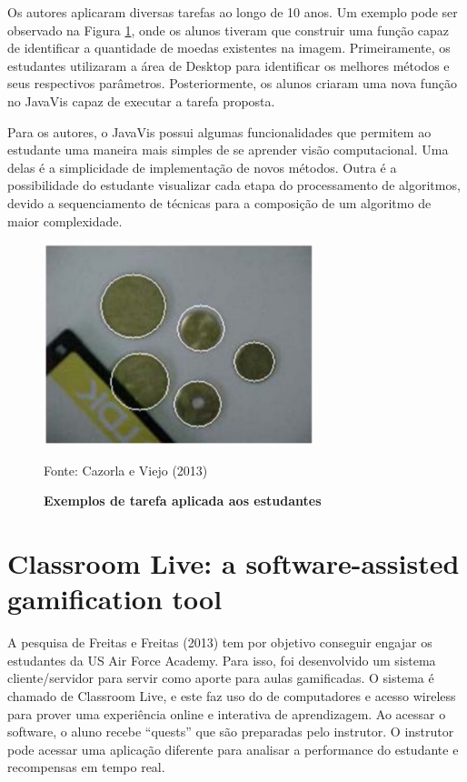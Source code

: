 \documentclass[
	12pt,				%
	oneside,			%
	a4paper,			%
	english,			%
	french,				%
	spanish,			%
	brazil,				%
	]{abntex2}
\begin{document}
Os autores aplicaram diversas tarefas ao longo de 10 anos. Um exemplo pode ser observado na Figura \ref{fig:javavis_avaliacao}, onde os alunos tiveram que construir uma função capaz de identificar a quantidade de moedas existentes na imagem. Primeiramente, os estudantes utilizaram a área de Desktop para identificar os melhores métodos e seus respectivos parâmetros. Posteriormente, os alunos criaram uma nova função no JavaVis capaz de executar a tarefa proposta.

Para os autores, o JavaVis possui algumas funcionalidades que permitem ao estudante uma maneira mais simples de se aprender visão computacional. Uma delas é a simplicidade de implementação de novos métodos. Outra é a possibilidade do estudante visualizar cada etapa do processamento de algoritmos, devido a sequenciamento de técnicas para a composição de um algoritmo de maior complexidade.

\begin{figure}[ht]
\centering
\caption{\textbf{Exemplos de tarefa aplicada aos estudantes}}
\includegraphics[width=0.7\textwidth]{imagens/javavis_avaliacao.png}

Fonte: Cazorla e Viejo  (2013)
\label{fig:javavis_avaliacao}
\end{figure}

\section{Classroom Live: a software-assisted gamification tool}

A pesquisa de Freitas e Freitas (2013) tem por objetivo conseguir engajar os estudantes da US Air Force Academy. Para isso, foi desenvolvido um sistema cliente/servidor para servir como aporte para aulas gamificadas. O sistema é chamado de Classroom Live, e este faz uso do de computadores e acesso wireless para prover uma experiência online e interativa de aprendizagem. Ao acessar o software, o aluno recebe “quests” que são preparadas pelo instrutor. O instrutor pode acessar uma aplicação diferente para analisar a performance do estudante e recompensas em tempo real.
\end{document}
